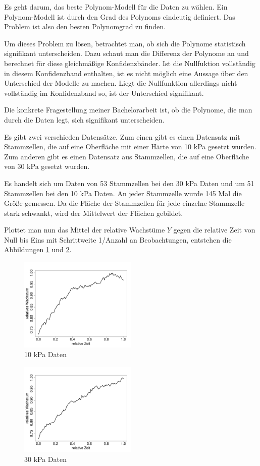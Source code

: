 \documentclass[12pt,a4paper]{article}
\theoremstyle{definition}
\theoremstyle{definition}
\theoremstyle{definition}
\theoremstyle{definition}
\begin{document}
Es geht darum, das beste Polynom-Modell für die Daten zu wählen. Ein Polynom-Modell ist durch den Grad des Polynoms eindeutig definiert. Das Problem ist also den besten Polynomgrad zu finden.

Um dieses Problem zu lösen, betrachtet man, ob sich die Polynome statistisch signifikant unterscheiden. Dazu schaut man die Differenz der Polynome an und berechnet für diese gleichmäßige Konfidenzbänder. Ist die Nullfuktion vollständig in diesem Konfidenzband enthalten, ist es nicht möglich eine Aussage über den Unterschied der Modelle zu machen. Liegt die Nullfunktion allerdings nicht vollständig im Konfidenzband so, ist der Unterschied signifikant.

Die konkrete Fragestellung meiner Bachelorarbeit ist, ob die Polynome, die man durch die Daten legt, sich signifikant unterscheiden.

Es gibt zwei verschieden Datensätze. Zum einen gibt es einen Datensatz mit Stammzellen, die auf eine Oberfläche mit einer Härte von 10 kPa gesetzt wurden. Zum anderen gibt es einen Datensatz aus Stammzellen, die auf eine Oberfläche von 30 kPa gesetzt wurden. 

Es handelt sich um Daten von 53 Stammzellen bei den 30 kPa Daten und um 51 Stammzellen bei den 10 kPa Daten. An jeder Stammzelle wurde 145 Mal die Größe gemessen. Da die Fläche der Stammzellen für jede einzelne Stammzelle stark schwankt, wird der Mittelwert der Flächen gebildet.

Plottet man nun das Mittel der relative Wachstüme $Y$ gegen die relative Zeit von Null bis Eins mit Schrittweite 1/Anzahl an Beobachtungen, entstehen die Abbildungen \ref{10kPa-data} und \ref{30kPa-data}. 

\begin{figure}[H] 
  \centering
     \includegraphics[width=0.5\textwidth]{10kPa-data.pdf}
  \caption{10 kPa Daten}
  \label{10kPa-data}
\end{figure}

\begin{figure}[H] 
  \centering
     \includegraphics[width=0.5\textwidth]{30kPa-data.pdf}
  \caption{30 kPa Daten}
  \label{30kPa-data}
\end{figure}
\end{document}
